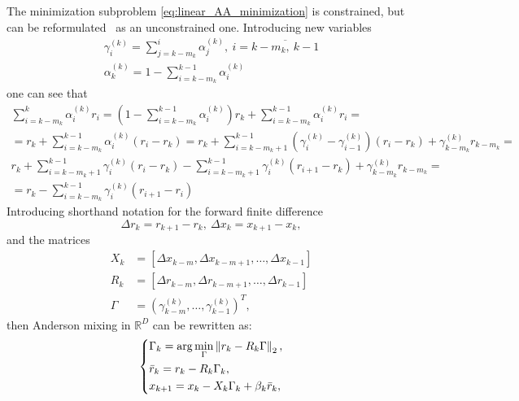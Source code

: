 \documentclass{article} %
\numberwithin{equation}{subsection}
\numberwithin{theorem}{section}
\begin{document}
        The minimization subproblem \eqref{eq:linear_AA_minimization} is constrained, but can be reformulated~\cite{anderson1965iterative} as an unconstrained one.
        Introducing new variables
        \begin{gather*}
            \gamma^{(k)}_i = \sum\limits_{j = k - m_k}^{i} \alpha^{(k)}_j,\ i = \overline{k - m_k,\ k -1} \\
            \alpha^{(k)}_k = 1 - \sum\limits_{i = k - m_k}^{k - 1}\alpha^{(k)}_i
        \end{gather*}
        one can see that
        \begin{multline*}
            \sum\limits_{i = k - m_k}^{k}\alpha^{(k)}_i r_i = 
                \left(1 - \sum\limits_{i = k - m_k}^{k - 1}\alpha^{(k)}_i\right)r_k + \sum\limits_{i = k - m_k}^{k - 1}\alpha^{(k)}_i r_i = \\ =
                r_k + \sum\limits_{i = k - m_k}^{k - 1}\alpha^{(k)}_i (r_i - r_k) = 
                r_k + \sum\limits_{i = k - m_k +1}^{k-1}(\gamma^{(k)}_i - \gamma^{(k)}_{i - 1})(r_i - r_k)  + \gamma^{(k)}_{k - m_k}r_{k - m_k}= \\
                r_k + \sum\limits_{i = k - m_k +1}^{k-1}\gamma^{(k)}_i(r_i - r_k) - \sum\limits_{i = k - m_k +1}^{k-1}\gamma^{(k)}_i(r_{i+1} - r_k) + \gamma^{(k)}_{k - m_k}r_{k - m_k} = \\ =
                r_k - \sum\limits_{i = k - m_k }^{k-1}\gamma^{(k)}_i (r_{i+1} - r_{i})
        \end{multline*}
        Introducing shorthand notation for the forward finite difference
        \begin{equation}
            \Delta r_k = r_{k+1} - r_k,\ \Delta x_k = x_{k+1} - x_k,
        \end{equation}
        and the matrices
        \begin{align}\label{eq:anderson_rd}
            X_k &=[\Delta x_{k-m},\Delta x_{k-m+1},\ldots,\Delta x_{k-1}]\\
            R_k &= [\Delta r_{k-m},\Delta r_{k-m+1},\ldots,\Delta r_{k-1}] \\
            \Gamma &= \left(\gamma^{(k)}_{k - m}, \dots, \gamma^{(k)}_{k - 1} \right)^T,
        \end{align}
        then Anderson mixing in $\mathbb{R}^D$ can be rewritten as:
        \begin{equation}
            \left\{
            \begin{aligned}
                & \Gamma_k = \arg\min_\Gamma \left\| r_k - R_k\Gamma \right\|_2,\\
                & \bar{r}_k = r_k - R_k\Gamma_k,\\
                & x_{k+1} = x_k-X_k\Gamma_k+\beta_k \Bar{r}_k,
            \end{aligned}
            \right.
        \end{equation}
\end{document}
